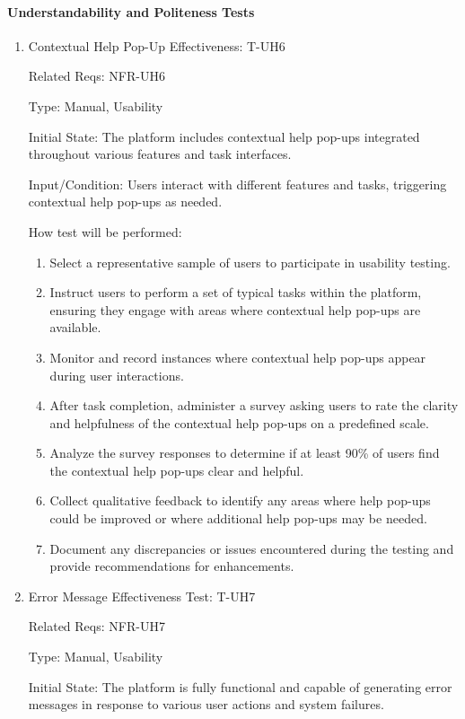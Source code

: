 \documentclass[12pt, titlepage]{article}
\begin{document}
\paragraph{Understandability and Politeness Tests}
\begin{enumerate}

\item{Contextual Help Pop-Up Effectiveness: T-UH6\\}

Related Reqs: NFR-UH6

Type: Manual, Usability

Initial State: The platform includes contextual help pop-ups integrated throughout various features and task interfaces.

Input/Condition: Users interact with different features and tasks, triggering contextual help pop-ups as needed.

How test will be performed:
\begin{enumerate}
    \item Select a representative sample of users to participate in usability testing.
    \item Instruct users to perform a set of typical tasks within the platform, ensuring they engage with areas where contextual help pop-ups are available.
    \item Monitor and record instances where contextual help pop-ups appear during user interactions.
    \item After task completion, administer a survey asking users to rate the clarity and helpfulness of the contextual help pop-ups on a predefined scale.
    \item Analyze the survey responses to determine if at least 90\% of users find the contextual help pop-ups clear and helpful.
    \item Collect qualitative feedback to identify any areas where help pop-ups could be improved or where additional help pop-ups may be needed.
    \item Document any discrepancies or issues encountered during the testing and provide recommendations for enhancements.
\end{enumerate}

\item{Error Message Effectiveness Test: T-UH7\\}

Related Reqs: NFR-UH7

Type: Manual, Usability

Initial State: The platform is fully functional and capable of generating error messages in response to various user actions and system failures.


\end{enumerate}
\end{document}
